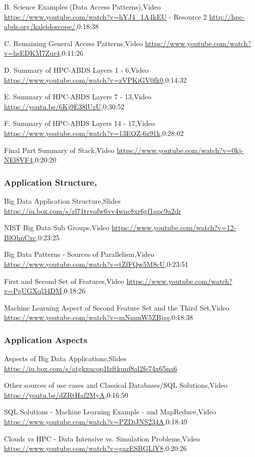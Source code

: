 B. Science Examples (Data Access Patterns),Video \url{https://www.youtube.com/watch?v=hYJ4_1A4kEU} -  Resource 2 \url{http://hpc-abds.org/kaleidoscope/},0:18:38

C. Remaining General Access Patterns,Video \url{https://www.youtube.com/watch?v=hsEDKM7Zur4},0:11:26

D. Summary of HPC-ABDS Layers 1 - 6,Video \url{https://www.youtube.com/watch?v=zVPKiGV0fk0},0:14:32

E. Summary of HPC-ABDS Layers 7 - 13,Video \url{https://youtu.be/6Kj9E38lUzU},0:30:52

F. Summary of HPC-ABDS Layers 14 - 17,Video \url{https://www.youtube.com/watch?v=13EQZ-6z91k},0:28:02

Final Part Summary of Stack,Video \url{https://www.youtube.com/watch?v=0kj-NEl8VF4},0:20:20

\subsubsection{Application Structure,}

Big Data Application Structure,Slides \url{https://iu.box.com/s/zl71trvqfw6vv4wnc8xr6gf1qpc9a2dr}

NIST Big Data Sub Groups,Video \url{https://www.youtube.com/watch?v=12-BlQhnCxc},0:23:25

Big Data Patterns - Sources of Parallelism,Video \url{https://www.youtube.com/watch?v=tZfFQw5M8cU},0:23:51

First and Second Set of Features,Video \url{https://www.youtube.com/watch?v=PgUGXql34DM},0:18:26

Machine Learning Aspect of Second Feature Set and the Third Set,Video \url{https://www.youtube.com/watch?v=mNmmW5ZBjgs},0:18:38

\subsubsection{Application Aspects}

Aspects of Big Data Applications,Slides \url{https://iu.box.com/s/atgkxucop1lzftkunf8al2fe74x65na6}

Other sources of use cases and Classical Databases/SQL Solutions,Video \url{https://youtu.be/dZRtHaf2MyA},0:16:50

SQL Solutions -  Machine Learning Example -  and MapReduce,Video \url{https://www.youtube.com/watch?v=PZDiJNS234A},0:18:49

Clouds vs HPC -  Data Intensive vs. Simulation Problems,Video \url{https://www.youtube.com/watch?v=gazESBGLlY8},0:20:26

